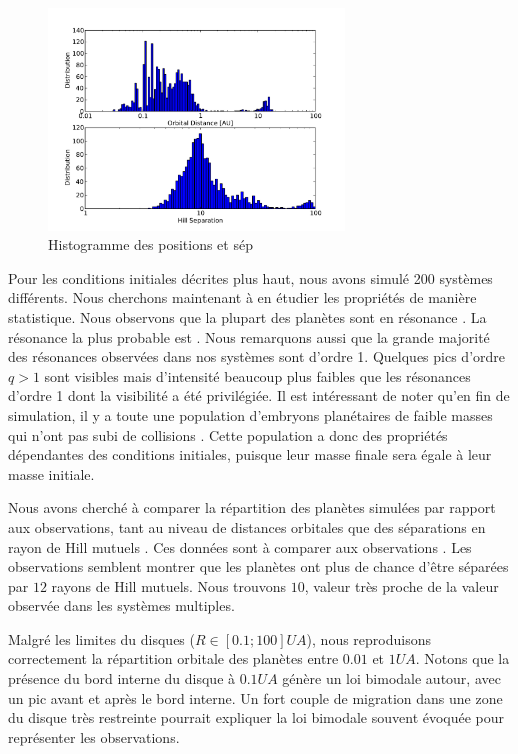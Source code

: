 \begin{figure}[htbp]
\centering
\includegraphics[width=0.7\textwidth]{figure/HSE/hist_ad.pdf}
\caption{Histogramme des positions et sép}\label{fig:HSE_stat_dist}
\end{figure}

Pour les conditions initiales décrites plus haut, nous avons simulé 200 systèmes différents. Nous cherchons maintenant à en étudier les propriétés de manière statistique. Nous observons que la plupart des planètes sont en résonance . La résonance la plus probable est . Nous remarquons aussi que la grande majorité des résonances observées dans nos systèmes sont d'ordre 1. Quelques pics d'ordre $q>1$ sont visibles mais d'intensité beaucoup plus faibles que les résonances d'ordre 1 dont la visibilité a été privilégiée. Il est intéressant de noter qu'en fin de simulation, il y a toute une population d'embryons planétaires de faible masses qui n'ont pas subi de collisions . Cette population a donc des propriétés dépendantes des conditions initiales, puisque leur masse finale sera égale à leur masse initiale. 

Nous avons cherché à comparer la répartition des planètes simulées par rapport aux observations, tant au niveau de distances orbitales que des séparations en rayon de Hill mutuels . Ces données sont à comparer aux observations . Les observations semblent montrer que les planètes ont plus de chance d'être séparées par $12$ rayons de Hill mutuels. Nous trouvons $10$, valeur très proche de la valeur observée dans les systèmes multiples. 

Malgré les limites du disques ($R\in[0.1;100]\unit{UA}$), nous reproduisons correctement la répartition orbitale des planètes entre $0.01$ et $1\unit{UA}$. Notons que la présence du bord interne du disque à $0.1\unit{UA}$ génère un loi bimodale autour, avec un pic avant et après le bord interne. Un fort couple de migration dans une zone du disque très restreinte pourrait expliquer la loi bimodale souvent évoquée pour représenter les observations. 

